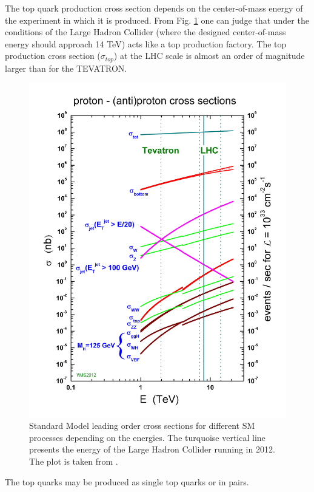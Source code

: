 The top quark production cross section depends on the center-of-mass energy of the experiment in which it is produced. From Fig. \ref{fig:SM_XSec_Prod}
one can judge that under the conditions of the Large Hadron Collider (where the designed center-of-mass energy should approach 14 TeV) acts like 
a top production factory. The top production cross section ($\sigma_{top}$) at the LHC scale is almost an order of magnitude larger than for the
TEVATRON.

\begin{figure}[p]
  \centering
  \includegraphics[width=1.0\textwidth]{01_Theory_SM/plots/crosssections2013.png}
  \caption{Standard Model leading order cross sections for different SM processes depending on the energies. The turquoise vertical line presents the energy
  of the Large Hadron Collider running in 2012. The plot is taken from \cite{Stirling}.}
  \label{fig:SM_XSec_Prod}
\end{figure}

The top quarks may be produced as single top quarks or in pairs.

